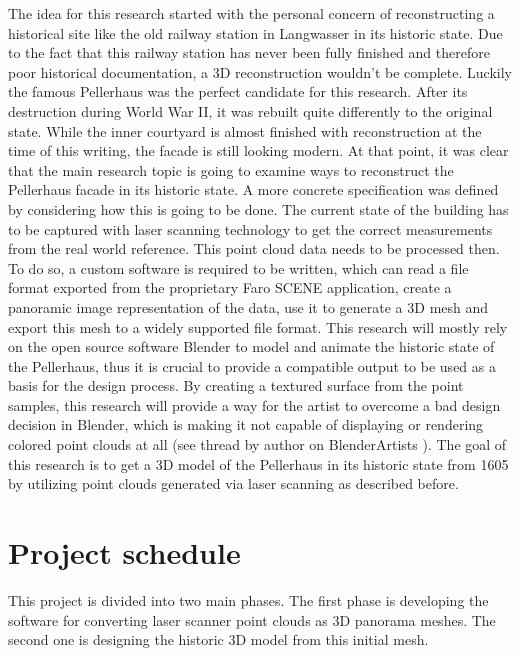 The idea for this research started with the personal concern of reconstructing a historical site like the old railway station in Langwasser in its historic state. Due to the fact that this railway station has never been fully finished and therefore poor historical documentation, a 3D reconstruction wouldn't be complete. Luckily the famous Pellerhaus was the perfect candidate for this research. After its destruction during World War II, it was rebuilt quite differently to the original state. While the inner courtyard is almost finished with reconstruction at the time of this writing, the facade is still looking modern. At that point, it was clear that the main research topic is going to examine ways to reconstruct the Pellerhaus facade in its historic state.
A more concrete specification was defined by considering how this is going to be done. The current state of the building has to be captured with laser scanning technology to get the correct measurements from the real world reference. This point cloud data needs to be processed then. To do so, a custom software is required to be written, which can read a file format exported from the proprietary Faro SCENE application, create a panoramic image representation of the data, use it to generate a 3D mesh and export this mesh to a widely supported file format. This research will mostly rely on the open source software Blender to model and animate the historic state of the Pellerhaus, thus it is crucial to provide a compatible output to be used as a basis for the design process. By creating a textured surface from the point samples, this research will provide a way for the artist to overcome a bad design decision in Blender, which is making it not capable of displaying or rendering colored point clouds at all (see thread by author on BlenderArtists \parencite{webBlenderArtistsPointCloudSupport} ). The goal of this research is to get a 3D model of the Pellerhaus in its historic state from 1605 by utilizing point clouds generated via laser scanning as described before.

\section{Project schedule}

This project is divided into two main phases. The first phase is developing the software for converting laser scanner point clouds as 3D panorama meshes. The second one is designing the historic 3D model from this initial mesh.\\

